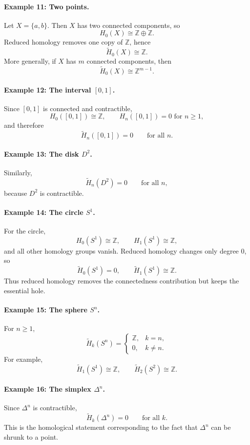 \documentclass[12pt,a4paper]{article}
\theoremstyle{notespace}
\begin{document}
\paragraph{Example 11: Two points.}
Let \(X=\{a,b\}\). Then \(X\) has two connected components, so
\[
H_0(X)\cong \mathbb{Z}\oplus \mathbb{Z}.
\]
Reduced homology removes one copy of \(\mathbb{Z}\), hence
\[
\widetilde{H}_0(X)\cong \mathbb{Z}.
\]
More generally, if \(X\) has \(m\) connected components, then
\[
\widetilde{H}_0(X)\cong \mathbb{Z}^{m-1}.
\]

\paragraph{Example 12: The interval \([0,1]\).}
Since \([0,1]\) is connected and contractible,
\[
H_0([0,1])\cong \mathbb{Z}, \qquad H_n([0,1])=0 \text{ for } n\ge 1,
\]
and therefore
\[
\widetilde{H}_n([0,1])=0 \qquad \text{for all } n.
\]

\paragraph{Example 13: The disk \(D^2\).}
Similarly,
\[
\widetilde{H}_n(D^2)=0 \qquad \text{for all } n,
\]
because \(D^2\) is contractible.

\paragraph{Example 14: The circle \(S^1\).}
For the circle,
\[
H_0(S^1)\cong \mathbb{Z}, \qquad H_1(S^1)\cong \mathbb{Z},
\]
and all other homology groups vanish. Reduced homology changes only degree \(0\), so
\[
\widetilde{H}_0(S^1)=0, \qquad \widetilde{H}_1(S^1)\cong \mathbb{Z}.
\]
Thus reduced homology removes the connectedness contribution but keeps the essential hole.

\paragraph{Example 15: The sphere \(S^n\).}
For \(n\ge 1\),
\[
\widetilde{H}_k(S^n)=
\begin{cases}
	\mathbb{Z}, & k=n,\\[1mm]
	0, & k\neq n.
\end{cases}
\]
For example,
\[
\widetilde{H}_1(S^1)\cong \mathbb{Z}, \qquad
\widetilde{H}_2(S^2)\cong \mathbb{Z}.
\]

\paragraph{Example 16: The simplex \(\Delta^n\).}
Since \(\Delta^n\) is contractible,
\[
\widetilde{H}_k(\Delta^n)=0 \qquad \text{for all } k.
\]
This is the homological statement corresponding to the fact that \(\Delta^n\) can be shrunk to a point.
\end{document}
